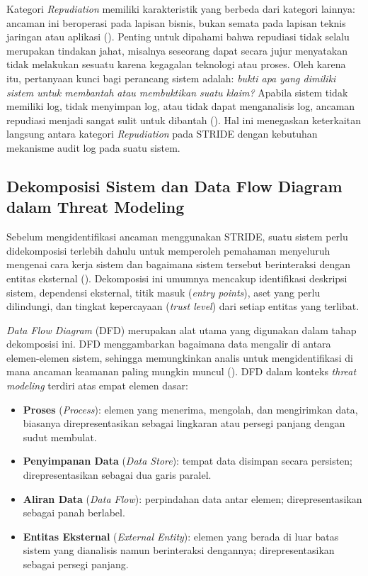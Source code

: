 Kategori \textit{Repudiation} memiliki karakteristik yang berbeda dari
kategori lainnya: ancaman ini beroperasi pada lapisan bisnis, bukan
semata pada lapisan teknis jaringan atau aplikasi (\cite{shostack2014}).
Penting untuk dipahami bahwa repudiasi tidak selalu merupakan tindakan
jahat, misalnya seseorang dapat secara jujur menyatakan tidak melakukan
sesuatu karena kegagalan teknologi atau proses. Oleh karena itu,
pertanyaan kunci bagi perancang sistem adalah: \textit{bukti apa yang
dimiliki sistem untuk membantah atau membuktikan suatu klaim?} Apabila
sistem tidak memiliki log, tidak menyimpan log, atau tidak dapat
menganalisis log, ancaman repudiasi menjadi sangat sulit untuk dibantah
(\cite{shostack2014}). Hal ini menegaskan keterkaitan langsung antara
kategori \textit{Repudiation} pada STRIDE dengan kebutuhan mekanisme
audit log pada suatu sistem.

\subsection{Dekomposisi Sistem dan Data Flow Diagram dalam Threat
Modeling}
\label{subsec:dfd-threat-modeling}

Sebelum mengidentifikasi ancaman menggunakan STRIDE, suatu sistem perlu
didekomposisi terlebih dahulu untuk memperoleh pemahaman menyeluruh
mengenai cara kerja sistem dan bagaimana sistem tersebut berinteraksi
dengan entitas eksternal (\cite{owasp_threat_modeling}). Dekomposisi
ini umumnya mencakup identifikasi deskripsi sistem, dependensi
eksternal, titik masuk (\textit{entry points}), aset yang perlu
dilindungi, dan tingkat kepercayaan (\textit{trust level}) dari setiap
entitas yang terlibat.

\textit{Data Flow Diagram} (DFD) merupakan alat utama yang digunakan
dalam tahap dekomposisi ini. DFD menggambarkan bagaimana data mengalir
di antara elemen-elemen sistem, sehingga memungkinkan analis untuk
mengidentifikasi di mana ancaman keamanan paling mungkin muncul
(\cite{owasp_threat_modeling}). DFD dalam konteks \textit{threat
modeling} terdiri atas empat elemen dasar:

\begin{itemize}
    \item \textbf{Proses} (\textit{Process}): elemen yang menerima,
    mengolah, dan mengirimkan data, biasanya direpresentasikan sebagai
    lingkaran atau persegi panjang dengan sudut membulat.
    \item \textbf{Penyimpanan Data} (\textit{Data Store}): tempat data
    disimpan secara persisten; direpresentasikan sebagai dua garis
    paralel.
    \item \textbf{Aliran Data} (\textit{Data Flow}): perpindahan data
    antar elemen; direpresentasikan sebagai panah berlabel.
    \item \textbf{Entitas Eksternal} (\textit{External Entity}):
    elemen yang berada di luar batas sistem yang dianalisis namun
    berinteraksi dengannya; direpresentasikan sebagai persegi panjang.
\end{itemize}


